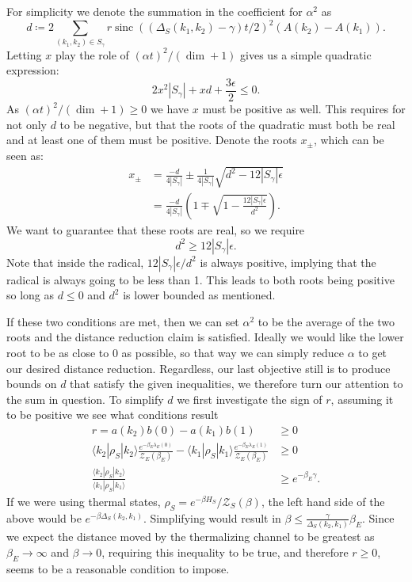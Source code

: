 \documentclass{article}
\newcommand{\ket}[1]{|#1\rangle}
\newcommand{\bra}[1]{\langle #1|}
\newcommand{\parens}[1]{\left( #1 \right)}
\newcommand{\partfun}{\mathcal{Z}}
\DeclareMathOperator{\sinc}{sinc}
\begin{document}
    For simplicity we denote the summation in the coefficient for $\alpha^2$ as
    $$d \coloneqq 2 \sum_{(k_1, k_2) \in S_{\gamma}} r \sinc((\Delta_S(k_1, k_2) - \gamma) t/2)^2 (A(k_2) - A(k_1)).$$
    Letting $x$ play the role of $(\alpha t)^2 / (\dim + 1)$ gives us a simple quadratic expression:
    \begin{equation}
        2 x^2 |S_{\gamma}| + x d + \frac{3 \epsilon}{2} \leq 0.
    \end{equation}
    As $(\alpha t)^2 / (\dim + 1) \geq 0$ we have $x$ must be positive as well. This requires for not only $d$ to be negative, but that the roots of the quadratic must both be real and at least one of them must be positive. Denote the roots $x_{\pm}$, which can be seen as:
    \begin{align}
        x_{\pm} &= \frac{-d}{4 |S_{\gamma}|} \pm \frac{1}{4 |S_{\gamma}|} \sqrt{d^2 - 12 |S_{\gamma}| \epsilon} \\
        &= \frac{-d}{4 |S_{\gamma}|} \parens{1 \mp \sqrt{1 - \frac{12 |S_{\gamma}| \epsilon}{d^2}}}.
    \end{align}
    We want to guarantee that these roots are real, so we require 
    \begin{equation}
        d^2 \geq 12 |S_{\gamma}| \epsilon. \label{eq:d_squared_epsilon_bound}
    \end{equation}
    Note that inside the radical, $12  |S_{\gamma}| \epsilon / d^2$ is always positive, implying that the radical is always going to be less than 1. This leads to both roots being positive so long as $d \leq 0$ and $d^2$ is lower bounded as mentioned.
    
    If these two conditions are met, then we can set $\alpha^2$ to be the average of the two roots and the distance reduction claim is satisfied. Ideally we would like the lower root to be as close to 0 as possible, so that way we can simply reduce $\alpha$ to get our desired distance reduction. Regardless, our last objective still is to produce bounds on $d$ that satisfy the given inequalities, we therefore turn our attention to the sum in question. To simplify $d$ we first investigate the sign of $r$, assuming it to be positive we see what conditions result
    \begin{align}
        r = a(k_2) b(0) - a(k_1) b(1) &\geq 0 \\
        \bra{k_2} \rho_S \ket{k_2} \frac{e^{-\beta_E \lambda_E(0)}}{\partfun_E(\beta_E)} - \bra{k_1} \rho_S \ket{k_1} \frac{e^{-\beta_E \lambda_E(1)}}{\partfun_E(\beta_E)} &\geq 0 \\
        \frac{\bra{k_2} \rho_S \ket{k_2}}{\bra{k_1} \rho_S \ket{k_1}} &\geq e^{-\beta_E \gamma}. \label{eq:bound_on_rho_s_for_r}
    \end{align}
    If we were using thermal states, $\rho_S = e^{-\beta H_S} / \partfun_S(\beta)$, the left hand side of the above would be $e^{-\beta \Delta_S(k_2, k_1)}$. Simplifying would result in $\beta \leq \frac{\gamma}{\Delta_S(k_2, k_1)} \beta_E$. Since we expect the distance moved by the thermalizing channel to be greatest as $\beta_E \to \infty$ and $\beta \to 0$, requiring this inequality to be true, and therefore $r \geq 0$, seems to be a reasonable condition to impose.
    
\end{document}
